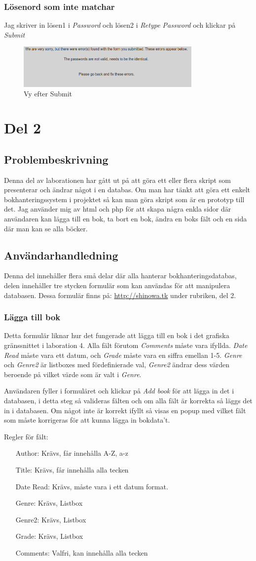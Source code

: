 \documentclass[11pt, titlepage, oneside, a4paper]{article}
\newcommand{\Section}[1]{\section{#1}\vspace{-8pt}}
\newcommand{\Subsection}[1]{\vspace{-4pt}\subsection{#1}\vspace{-8pt}}
\newcommand{\Subsubsection}[1]{\vspace{-4pt}\subsubsection{#1}\vspace{-8pt}}
\begin{document}
		\Subsubsection{Lösenord som inte matchar}
		Jag skriver in lösen1 i \emph{Password} och lösen2 i \emph{Retype Password} och klickar på \emph{Submit}
		\begin{figure}[ht!]
		\centering
		\includegraphics[width=90mm]{del1_fel_omatch.png}
		\caption{Vy efter Submit}
		\end{figure}

		\newpage
	\Section{Del 2}
		\Subsection{Problembeskrivning}
		Denna del av laborationen har gått ut på att göra ett eller flera skript som presenterar och ändrar något i en databas. Om man har tänkt att göra ett enkelt bokhanteringssystem i projektet så kan man göra skript som är en prototyp till det.
		Jag använder mig av html och php för att skapa några enkla sidor där användaren kan lägga till en bok, ta bort en bok, ändra en boks fält och en sida där man kan se alla böcker.
		
		\Subsection{Användarhandledning}
		Denna del innehåller flera små delar där alla hanterar bokhanteringsdatabas, delen innehåller tre stycken formulär som kan användas för att manipulera databasen.
		Dessa formulär finns på: \url{http://shinowa.tk} under rubriken, del 2.
		
		\Subsubsection{Lägga till bok}
		Detta formulär liknar hur det fungerade att lägga till en bok i det grafiska gränssnittet i laboration 4. Alla fält förutom \emph{Comments} måste vara ifyllda.
		\emph{Date Read} måste vara ett datum, och \emph{Grade} måste vara en siffra emellan 1-5.
		\emph{Genre} och \emph{Genre2} är listboxes med fördefinierade val, \emph{Genre2} ändrar dess värden beroende på vilket värde som är valt i \emph{Genre}.
		
		Användaren fyller i formuläret och klickar på \emph{Add book} för att lägga in det i databasen, i detta steg så valideras fälten och om alla fält är korrekta så läggs det in i databasen.
		Om något inte är korrekt ifyllt så visas en popup med vilket fält som måste korrigeras för att kunna lägga in bokdata't.
		

		Regler för fält:
		\begin{itemize}
		 \item[Author:] Krävs, får innehålla A-Z, a-z 
		 \item[Title:] Krävs, får innehålla alla tecken
		 \item[Date Read:] Krävs, måste vara i ett datum format.
		 \item[Genre:] Krävs, Listbox
		 \item[Genre2:] Krävs, Listbox
		 \item[Grade:] Krävs, Listbox
		 \item[Comments:] Valfri, kan innehålla alla tecken
		\end{itemize}
		
\end{document}
